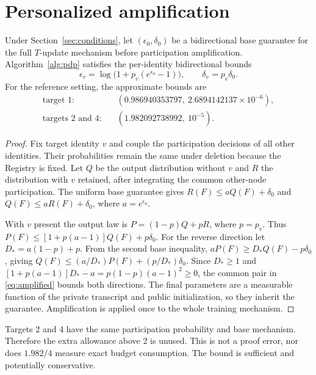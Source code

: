 \section{Personalized amplification}
\begin{theorem}\label{thm:pdp}
Under Section~\ref{sec:conditions}, let $(\epsilon_0,\delta_0)$ be a bidirectional base guarantee for the full $T$-update mechanism before participation amplification. Algorithm~\ref{alg:pdp} satisfies the per-identity bidirectional bounds
\begin{equation}
 \epsilon_v=\log\bigl(1+p_v(e^{\epsilon_0}-1)\bigr),\qquad
 \delta_v=p_v\delta_0.\label{eq:amplified}
\end{equation}
For the reference setting, the approximate bounds are
\begin{align*}
\text{target 1:}\quad &(0.986940353797,\ 2.6894142137\times10^{-6}),\\
\text{targets 2 and 4:}\quad &(1.982092738992,\ 10^{-5}).
\end{align*}
\end{theorem}
\begin{proof}
Fix target identity $v$ and couple the participation decisions of all other identities. Their probabilities remain the same under deletion because the Registry is fixed. Let $Q$ be the output distribution without $v$ and $R$ the distribution with $v$ retained, after integrating the common other-node participation. The uniform base guarantee gives $R(F)\leq aQ(F)+\delta_0$ and $Q(F)\leq aR(F)+\delta_0$, where $a=e^{\epsilon_0}$.

With $v$ present the output law is $P=(1-p)Q+pR$, where $p=p_v$. Thus $P(F)\leq[1+p(a-1)]Q(F)+p\delta_0$. For the reverse direction let $D_*=a(1-p)+p$. From the second base inequality,
$aP(F)\geq D_*Q(F)-p\delta_0$, giving
$Q(F)\leq (a/D_*)P(F)+(p/D_*)\delta_0$.
Since $D_*\geq1$ and $[1+p(a-1)]D_*-a=p(1-p)(a-1)^2\geq0$, the common pair in \eqref{eq:amplified} bounds both directions. The final parameters are a measurable function of the private transcript and public initialization, so they inherit the guarantee. Amplification is applied once to the whole training mechanism.
\end{proof}

Targets 2 and 4 have the same participation probability and base mechanism. Therefore the extra allowance above 2 is unused. This is not a proof error, nor does $1.982/4$ measure exact budget consumption. The bound is sufficient and potentially conservative.

